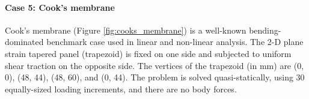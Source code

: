 \documentclass[sn-mathphys,Numbered]{sn-jnl}%
\begin{document}
\paragraph{Case 5: Cook's membrane}
Cook's membrane (Figure \ref{fig:cooks_membrane}) is a well-known bending-dominated benchmark case used in linear and non-linear analysis.
The 2-D plane strain tapered panel (trapezoid) is fixed on one side and subjected to uniform shear traction on the opposite side.
The vertices of the trapezoid (in mm) are (0, 0), (48, 44), (48, 60),  and (0, 44).
The problem is solved quasi-statically, using 30 equally-sized loading increments, and there are no body forces.
\end{document}
